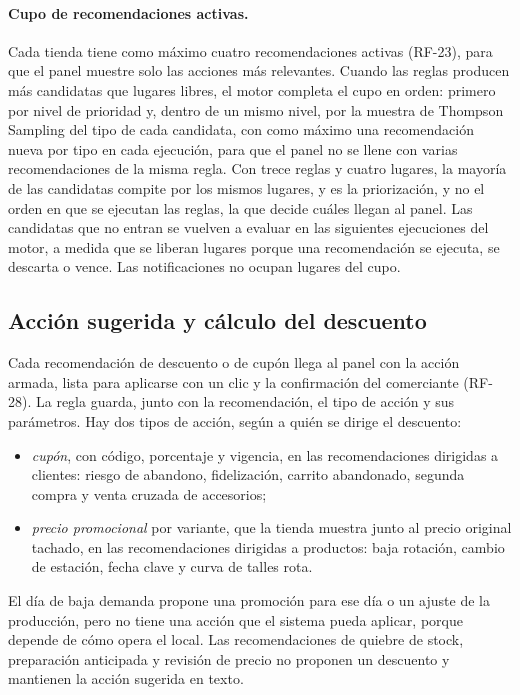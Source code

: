 \paragraph{Cupo de recomendaciones activas.} Cada tienda tiene como máximo cuatro recomendaciones activas (RF-23), para que el panel muestre solo las acciones más relevantes. Cuando las reglas producen más candidatas que lugares libres, el motor completa el cupo en orden: primero por nivel de prioridad y, dentro de un mismo nivel, por la muestra de Thompson Sampling del tipo de cada candidata, con como máximo una recomendación nueva por tipo en cada ejecución, para que el panel no se llene con varias recomendaciones de la misma regla.
Con trece reglas y cuatro lugares, la mayoría de las candidatas compite por los mismos lugares, y es la priorización, y no el orden en que se ejecutan las reglas, la que decide cuáles llegan al panel. Las candidatas que no entran se vuelven a evaluar en las siguientes ejecuciones del motor, a medida que se liberan lugares porque una recomendación se ejecuta, se descarta o vence. Las notificaciones no ocupan lugares del cupo.

\subsection{Acción sugerida y cálculo del descuento}
\label{sec:motor-accion}

Cada recomendación de descuento o de cupón llega al panel con la acción armada, lista para aplicarse con un clic y la confirmación del comerciante (RF-28). La regla guarda, junto con la recomendación, el tipo de acción y sus parámetros. Hay dos tipos de acción, según a quién se dirige el descuento:

\begin{itemize}
    \item \emph{cupón}, con código, porcentaje y vigencia, en las recomendaciones dirigidas a clientes: riesgo de abandono, fidelización, carrito abandonado, segunda compra y venta cruzada de accesorios;
    \item \emph{precio promocional} por variante, que la tienda muestra junto al precio original tachado, en las recomendaciones dirigidas a productos: baja rotación, cambio de estación, fecha clave y curva de talles rota.
\end{itemize}

El día de baja demanda propone una promoción para ese día o un ajuste de la producción, pero no tiene una acción que el sistema pueda aplicar, porque depende de cómo opera el local. Las recomendaciones de quiebre de stock, preparación anticipada y revisión de precio no proponen un descuento y mantienen la acción sugerida en texto.

